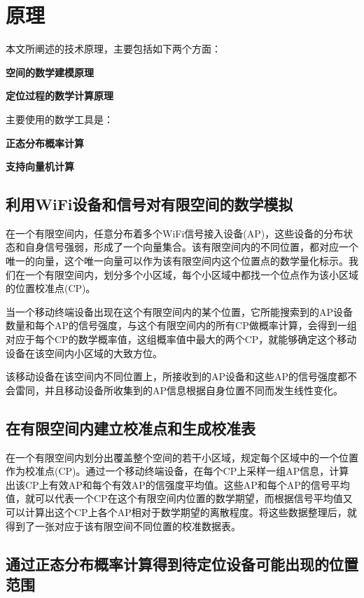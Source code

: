 \documentclass[UTF8, twocolumn ]{ctexart}
\begin{document}

\section{原理}
本文所阐述的技术原理，主要包括如下两个方面：
\begin{compactitem}
\item\textbf{空间的数学建模原理}
\item\textbf{定位过程的数学计算原理}
\end{compactitem}
\par
主要使用的数学工具是：
\begin{compactitem}
\item\textbf{正态分布概率计算}
\item\textbf{支持向量机计算}
\end{compactitem}

\subsection{利用WiFi设备和信号对有限空间的数学模拟}
在一个有限空间内，任意分布着多个WiFi信号接入设备(AP)，这些设备的分布状态和自身信号强弱，形成了一个向量集合。该有限空间内的不同位置，都对应一个唯一的向量，这个唯一向量可以作为该有限空间内这个位置点的数学量化标示。我们在一个有限空间内，划分多个小区域，每个小区域中都找一个位点作为该小区域的位置校准点(CP)。
\par
当一个移动终端设备出现在这个有限空间内的某个位置，它所能搜索到的AP设备数量和每个AP的信号强度，与这个有限空间内的所有CP做概率计算，会得到一组对应于每个CP的数学概率值，这组概率值中最大的两个CP，就能够确定这个移动设备在该空间内小区域的大致方位。
\par
该移动设备在该空间内不同位置上，所接收到的AP设备和这些AP的信号强度都不会雷同，并且移动设备所收集到的AP信息根据自身位置不同而发生线性变化。
\subsection{在有限空间内建立校准点和生成校准表}
在一个有限空间内划分出覆盖整个空间的若干小区域，规定每个区域中的一个位置作为校准点(CP)。通过一个移动终端设备，在每个CP上采样一组AP信息，计算出该CP上有效AP和每个有效AP的信强度平均值。这些AP和每个AP的信号平均值，就可以代表一个CP在这个有限空间内位置的数学期望，而根据信号平均值又可以计算出这个CP上各个AP相对于数学期望的离散程度。将这些数据整理后，就得到了一张对应于该有限空间不同位置的校准数据表。

\subsection{通过正态分布概率计算得到待定位设备可能出现的位置范围}
\end{document}
